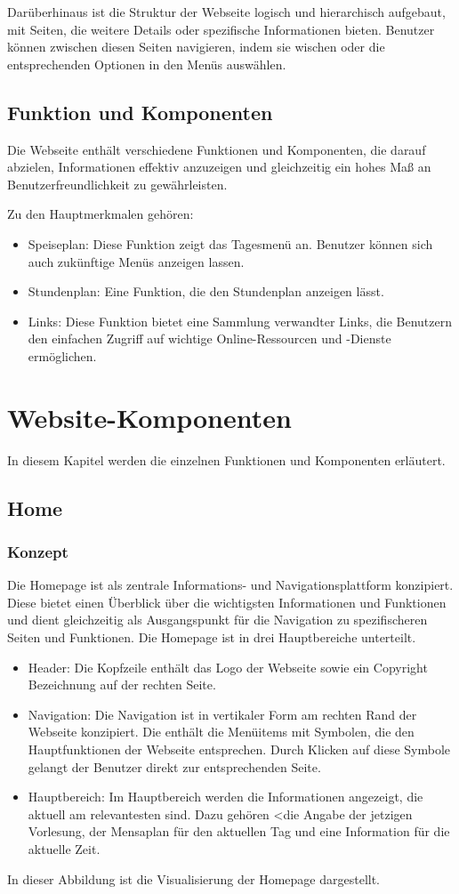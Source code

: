  Darüberhinaus ist die Struktur der Webseite logisch und hierarchisch aufgebaut, mit Seiten, die weitere Details oder spezifische Informationen bieten. Benutzer können zwischen diesen Seiten navigieren, indem sie wischen oder die entsprechenden Optionen in den Menüs auswählen.

\subsection{Funktion und Komponenten}
Die Webseite enthält verschiedene Funktionen und Komponenten, die darauf abzielen, Informationen effektiv anzuzeigen und gleichzeitig ein hohes Maß an Benutzerfreundlichkeit zu gewährleisten.

Zu den Hauptmerkmalen gehören: 
\begin{itemize}
	\item Speiseplan: Diese Funktion zeigt das Tagesmenü an. Benutzer können sich auch zukünftige Menüs anzeigen lassen.
	\item Stundenplan: Eine Funktion, die den Stundenplan anzeigen lässt.
	\item Links: Diese Funktion bietet eine Sammlung verwandter Links, die Benutzern den einfachen Zugriff auf wichtige Online-Ressourcen und -Dienste ermöglichen.
\end{itemize}

\section{Website-Komponenten}
In diesem Kapitel werden die einzelnen Funktionen und Komponenten erläutert.
\subsection{Home}
\subsubsection{Konzept}
Die Homepage ist als zentrale Informations- und Navigationsplattform konzipiert. Diese bietet einen Überblick über die wichtigsten Informationen und Funktionen und dient gleichzeitig als Ausgangspunkt für die Navigation zu spezifischeren Seiten und Funktionen.
Die Homepage ist in drei Hauptbereiche unterteilt.
\begin{itemize}
	\item Header: Die Kopfzeile enthält das Logo der Webseite sowie ein Copyright Bezeichnung auf der rechten Seite. 
	\item Navigation: Die Navigation ist in vertikaler Form am rechten Rand der Webseite konzipiert. Die enthält die Menüitems mit Symbolen, die den Hauptfunktionen der Webseite entsprechen. Durch Klicken auf diese Symbole gelangt der Benutzer direkt zur entsprechenden Seite.
	\item Hauptbereich: Im Hauptbereich werden die Informationen angezeigt, die aktuell am relevantesten sind. Dazu gehören <die Angabe der jetzigen Vorlesung, der Mensaplan für den aktuellen Tag und eine Information für die aktuelle Zeit.
\end{itemize} 
In dieser Abbildung ist die Visualisierung der Homepage dargestellt.

